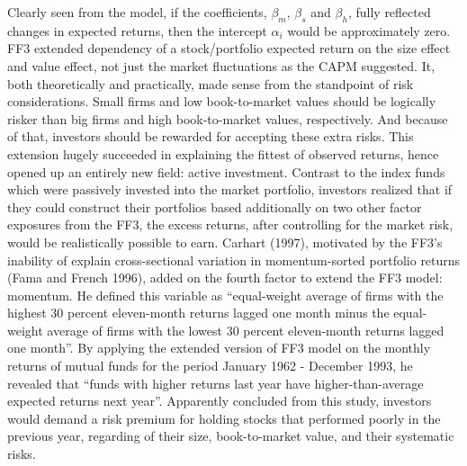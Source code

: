 Clearly seen from the model, if the coefficients, $\beta_m$, $\beta_s$ and $\beta_h$, fully reflected changes in expected returns, then the intercept $\alpha_i$ would be approximately zero. FF3 extended dependency of a stock/portfolio expected return on the size effect and value effect, not just the market fluctuations as the CAPM suggested. It, both theoretically and practically, made sense from the standpoint of risk considerations. Small firms and low book-to-market values should be logically risker than big firms and high book-to-market values, respectively. And because of that, investors should be rewarded for accepting these extra risks. This extension hugely succeeded in explaining the fittest of observed returns, hence opened up an entirely new field: active investment. Contrast to the index funds which were passively invested into the market portfolio, investors realized that if they could construct their portfolios based additionally on two other factor exposures from the FF3, the excess returns, after controlling for the market risk, would be realistically possible to earn.
Carhart (1997), motivated by the FF3’s inability of explain cross-sectional variation in momentum-sorted portfolio returns (Fama and French 1996), added on the fourth factor to extend the FF3 model: momentum. He defined this variable as “equal-weight average of firms with the highest 30 percent eleven-month returns lagged one month minus the equal-weight average of firms with the lowest 30 percent eleven-month returns lagged one month”. By applying the extended version of FF3 model on the monthly returns of mutual funds for the period January 1962 - December 1993, he revealed that “funds with higher returns last year have higher-than-average expected returns next year”. Apparently concluded from this study, investors would demand a risk premium for holding stocks that performed poorly in the previous year, regarding of their size, book-to-market value, and their systematic risks.
